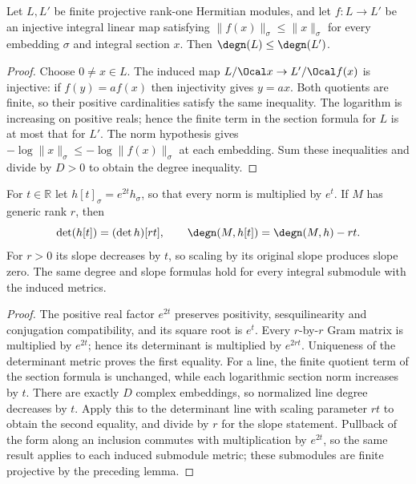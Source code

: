 \begin{lemma}
\label{lem:line-degree-contraction}
\leanok
Let $L,L'$ be finite projective rank-one Hermitian modules, and let
$f:L\to L'$ be an injective integral linear map satisfying
$\|f(x)\|_\sigma\leq\|x\|_\sigma$ for every embedding $\sigma$ and
integral section $x$. Then $\degn(L)\leq\degn(L')$.
\end{lemma}
\begin{proof}
Choose $0\ne x\in L$. The induced map
$L/\Ocal x\to L'/\Ocal f(x)$ is injective: if $f(y)=a f(x)$ then
injectivity gives $y=ax$. Both quotients are finite, so their positive
cardinalities satisfy the same inequality. The logarithm is increasing
on positive reals; hence the finite term in the section formula for $L$
is at most that for $L'$. The norm hypothesis gives
$-\log\|x\|_\sigma\leq-\log\|f(x)\|_\sigma$ at each embedding.
Sum these inequalities and divide by $D>0$ to obtain the degree inequality.
\end{proof}

\begin{lemma}
\label{lem:degree-metric-scaling}
\leanok
For $t\in\mathbb R$ let $h[t]_\sigma=e^{2t}h_\sigma$, so that every
norm is multiplied by $e^t$. If $M$ has generic rank $r$, then
\[
 \det(h[t])=(\det h)[rt],\qquad
 \degn(M,h[t])=\degn(M,h)-rt.
\]
For $r>0$ its slope decreases by $t$, so scaling by its original slope
produces slope zero. The same degree and slope formulas hold for every
integral submodule with the induced metrics.
\end{lemma}
\begin{proof}
The positive real factor $e^{2t}$ preserves positivity, sesquilinearity
and conjugation compatibility, and its square root is $e^t$.
Every $r$-by-$r$ Gram matrix is multiplied by $e^{2t}$; hence its
determinant is multiplied by $e^{2rt}$. Uniqueness of the determinant
metric proves the first equality. For a line, the finite quotient term
of the section formula is unchanged, while each logarithmic section
norm increases by $t$. There are exactly $D$ complex embeddings, so
normalized line degree decreases by $t$. Apply this to the determinant
line with scaling parameter $rt$ to obtain the second equality, and
divide by $r$ for the slope statement. Pullback of the form along an
inclusion commutes with multiplication by $e^{2t}$, so the same result
applies to each induced submodule metric; these submodules are finite
projective by the preceding lemma.
\end{proof}


